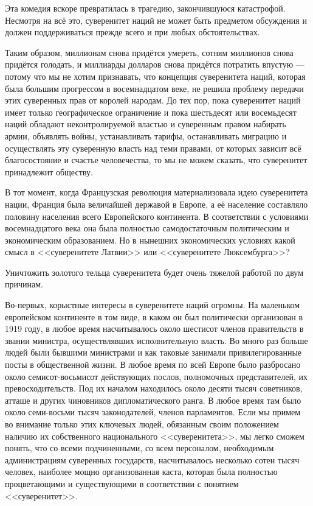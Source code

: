 Эта комедия вскоре превратилась в трагедию, закончившуюся катастрофой. Несмотря на всё это, суверенитет наций не может быть предметом обсуждения и должен поддерживаться прежде всего и при любых обстоятельствах.

Таким образом, миллионам снова придётся умереть, сотням миллионов снова придётся голодать, и миллиарды долларов снова придётся потратить впустую — потому что мы не хотим признавать, что концепция суверенитета наций, которая была большим прогрессом в восемнадцатом веке, не решила проблему передачи этих суверенных прав от королей народам. До тех пор, пока суверенитет наций имеет только географическое ограничение и пока шестьдесят или восемьдесят наций обладают неконтролируемой властью и суверенным правом набирать армии, объявлять войны, устанавливать тарифы, останавливать миграцию и осуществлять эту суверенную власть над теми правами, от которых зависит всё благосостояние и счастье человечества, то мы не можем сказать, что суверенитет принадлежит обществу.

В тот момент, когда Французская революция материализовала идею суверенитета нации, Франция была величайшей державой в Европе, а её население составляло половину населения всего Европейского континента. В соответствии с условиями восемнадцатого века она была полностью самодостаточным политическим и экономическим образованием. Но в нынешних экономических условиях какой смысл в <<суверенитете Латвии>> или <<суверенитете Люксембурга>>?

Уничтожить золотого тельца суверенитета будет очень тяжелой работой по двум причинам.

Во-первых, корыстные интересы в суверенитете наций огромны. На маленьком европейском континенте в том виде, в каком он был политически организован в 1919 году, в любое время насчитывалось около шестисот членов правительств в звании министра, осуществлявших исполнительную власть. Во много раз больше людей были бывшими министрами и как таковые занимали привилегированные посты в общественной жизни. В любое время по всей Европе было разбросано около семисот-восьмисот действующих послов, полномочных представителей, их превосходительств. Под их началом находилось около десяти тысяч советников, атташе и других чиновников дипломатического ранга. В любое время там было около семи-восьми тысяч законодателей, членов парламентов. Если мы примем во внимание только этих ключевых людей, обязанным своим положением наличию их собственного национального <<суверенитета>>, мы легко сможем понять, что со всеми подчиненными, со всем персоналом, необходимым администрациям суверенных государств, насчитывалось несколько сотен тысяч человек, наиболее мощно организованная каста, которая была полностью процветающими и существующими в соответствии с понятием <<суверенитет>>.

